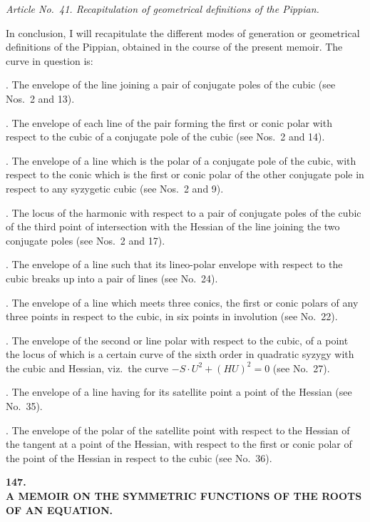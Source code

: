 \documentclass[11pt]{article}
\begin{document}
\medskip

\textit{Article No.~41. Recapitulation of geometrical definitions of the Pippian.}

\medskip

\noindent In conclusion, I will recapitulate the different modes of generation or geometrical definitions of the Pippian, obtained in the course of the present memoir. The curve in question is:

\medskip

. The envelope of the line joining a pair of conjugate poles of the cubic (see Nos.~2 and 13).

. The envelope of each line of the pair forming the first or conic polar with respect to the cubic of a conjugate pole of the cubic (see Nos.~2 and 14).

. The envelope of a line which is the polar of a conjugate pole of the cubic, with respect to the conic which is the first or conic polar of the other conjugate pole in respect to any syzygetic cubic (see Nos.~2 and 9).

. The locus of the harmonic with respect to a pair of conjugate poles of the cubic of the third point of intersection with the Hessian of the line joining the two conjugate poles (see Nos.~2 and 17).

. The envelope of a line such that its lineo-polar envelope with respect to the cubic breaks up into a pair of lines (see No.~24).

. The envelope of a line which meets three conics, the first or conic polars of any three points in respect to the cubic, in six points in involution (see No.~22).

. The envelope of the second or line polar with respect to the cubic, of a point the locus of which is a certain curve of the sixth order in quadratic syzygy with the cubic and Hessian, viz.\ the curve $-S \cdot U^2 + (HU)^2 = 0$ (see No.~27).

. The envelope of a line having for its satellite point a point of the Hessian (see No.~35).

. The envelope of the polar of the satellite point with respect to the Hessian of the tangent at a point of the Hessian, with respect to the first or conic polar of the point of the Hessian in respect to the cubic (see No.~36).

\bigskip

\begin{center}
{\Large\bfseries 147.}\\[1ex]
{\large\bfseries A MEMOIR ON THE SYMMETRIC FUNCTIONS OF THE ROOTS\\OF AN EQUATION.}
\end{center}
\end{document}
